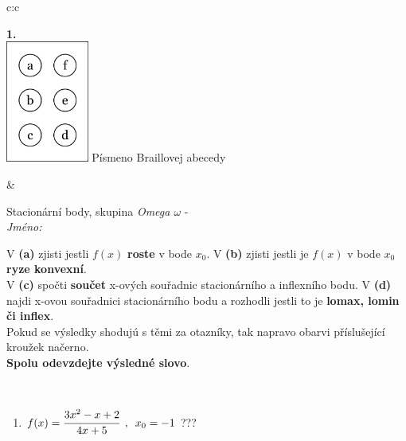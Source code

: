 \documentclass[10pt]{report}
\begin{document}
\begin{tabular}{c:c}
\begin{minipage}[c][104.5mm][t]{0.5\linewidth}
\begin{center}
\begin{minipage}{0.79\linewidth}
\end{minipage}
\begin{minipage}{0.20\linewidth}
\begin{center}
{\Huge\bfseries 1.} \\[2mm]
\includegraphics[height=40mm]{../images/braille.png}
{\small Písmeno Braillovej abecedy}
\end{center}
\end{minipage}
\end{center}
\end{minipage}
&
\begin{minipage}[c][104.5mm][t]{0.5\linewidth}
\begin{center}
\vspace{7mm}
{\huge Stacionární body, skupina \textit{Omega $\omega$} -}\\[5mm]
\textit{Jméno:}\phantom{xxxxxxxxxxxxxxxxxxxxxxxxxxxxxxxxxxxxxxxxxxxxxxxxxxxxxxxxxxxxxxxxx}\\[5mm]
\begin{minipage}{0.95\linewidth}
\begin{center}
{\small V \textbf{(a)} zjisti jestli $f(x)$ \textbf{roste} v bode $x_0$. V \textbf{(b)} zjisti jestli je $f(x)$ v bode $x_0$ \textbf{ryze konvexní}.\\V \textbf{(c)} spočti \textbf{součet} x-ových souřadnic stacionárního a inflexního bodu. V \textbf{(d)} najdi x-ovou souřadnici stacionárního bodu a rozhodli jestli to je \textbf{lomax, lomin či inflex}.\\Pokud se výsledky shodujú s těmi za otazníky, tak napravo obarvi příslušející kroužek načerno.\\\textbf{Spolu odevzdejte výsledné slovo}}.
\end{center}
\end{minipage}
\\[1mm]
\begin{minipage}{0.79\linewidth}
\begin{center}
\begin{varwidth}{\linewidth}
\begin{enumerate}
\normalsize
\item $f(x)=\cfrac{3x^2-x+2}{4x+5}\enspace , \enspace x_0=-1$\quad \dotfill\; ???\;\dotfill \quad {}

\end{enumerate}
\end{varwidth}
\end{center}
\end{minipage}
\end{center}
\end{minipage}
\end{tabular}
\end{document}
